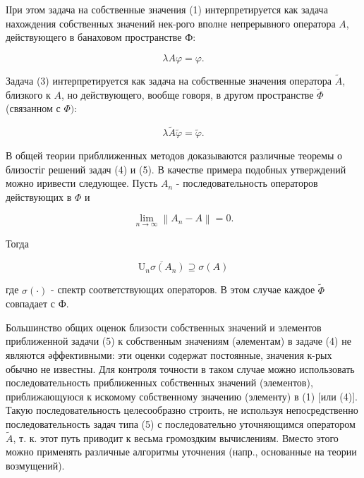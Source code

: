 \documentclass[10pt]{article}
\begin{document}
ІІри этом задача на собственные значения (1) интерпретируется как задача нахождения собственных значений нек-рого вполне непрерывного оператора $A$, действующего в банаховом пространстве Ф:



\[

\lambda A \varphi=\varphi .

\]



Задача (3) интерпретируется как задача на собственные значения оператора $\tilde{A}$, близкого к $A$, но действующего, вообще говоря, в другом пространстве $\tilde{\Phi}$ (связанном с $\Phi):$



\[

\lambda \tilde{A} \tilde{\varphi}=\tilde{\varphi} .

\]



В общей теории прибллиженных методов доказываются различные теоремы о близостіг решений задач (4) и (5). В качестве примера подобных утверждений можно иривести следующее. Пусть $A_{n}$ - последовательность операторов действующих в $\Phi$ и



\[

\lim _{n \rightarrow \infty}\left\|A_{n}-A\right\|=0 .

\]



Тогда



\[

\overline{\mathrm{U}_{n} \sigma\left(A_{n}\right)} \supseteq \sigma(A)

\]



где $\sigma(\cdot)$ - спектр соответствующих операторов. В этом случае каждое $\tilde{\Phi}$ совпадает с Ф.



Большинство общих оценок близости собственных значений и элементов приближенной задачи (5) к собственным значениям (әлементам) в задаче (4) не являются әффективными: эти оценки содержат постоянные, значения к-рых обычно не известны. Для контроля точности в таком случае можно использовать последовательность приближенных собственных значений (элементов), приближающуюся к искомому собственному значению (элементу) в (1) [или (4)]. Такую последовательность целесообразно строить, не используя непосредственно последовательность задач типа (5) с последовательно уточняющимся оператором $\tilde{A}$, т. к. этот путь приводит к весьма громоздким вычислениям. Вместо этого можно применять различные алгоритмы уточнения (напр., основанные на теории возмущений).
\end{document}

